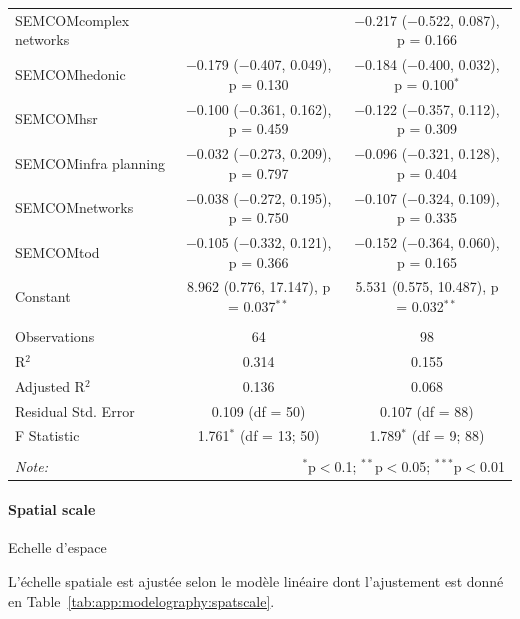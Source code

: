 \begin{table}
\begin{tabular}{@{\extracolsep{5pt}}lcc}
  SEMCOMcomplex networks &  & $-$0.217 ($-$0.522, 0.087), p = 0.166 \\ 
  SEMCOMhedonic & $-$0.179 ($-$0.407, 0.049), p = 0.130 & $-$0.184 ($-$0.400, 0.032), p = 0.100$^{*}$ \\ 
  SEMCOMhsr & $-$0.100 ($-$0.361, 0.162), p = 0.459 & $-$0.122 ($-$0.357, 0.112), p = 0.309 \\
  SEMCOMinfra planning & $-$0.032 ($-$0.273, 0.209), p = 0.797 & $-$0.096 ($-$0.321, 0.128), p = 0.404  \\ 
  SEMCOMnetworks & $-$0.038 ($-$0.272, 0.195), p = 0.750 & $-$0.107 ($-$0.324, 0.109), p = 0.335 \\ 
  SEMCOMtod & $-$0.105 ($-$0.332, 0.121), p = 0.366 & $-$0.152 ($-$0.364, 0.060), p = 0.165 \\ 
  Constant & 8.962 (0.776, 17.147), p = 0.037$^{**}$ & 5.531 (0.575, 10.487), p = 0.032$^{**}$ \\
 \hline \\[-1.8ex] 
Observations & 64 & 98 \\ 
R$^{2}$ & 0.314 & 0.155 \\ 
Adjusted R$^{2}$ & 0.136 & 0.068 \\ 
Residual Std. Error & 0.109 (df = 50) & 0.107 (df = 88) \\ 
F Statistic & 1.761$^{*}$ (df = 13; 50) & 1.789$^{*}$ (df = 9; 88) \\ 
\hline 
\hline \\[-1.8ex] 
\textit{Note:}  & \multicolumn{2}{r}{$^{*}$p$<$0.1; $^{**}$p$<$0.05; $^{***}$p$<$0.01} \\ 
\end{tabular} 
\end{table} 




\paragraph{Spatial scale}{Echelle d'espace}


L'échelle spatiale est ajustée selon le modèle linéaire dont l'ajustement est donné en Table~\ref{tab:app:modelography:spatscale}.



